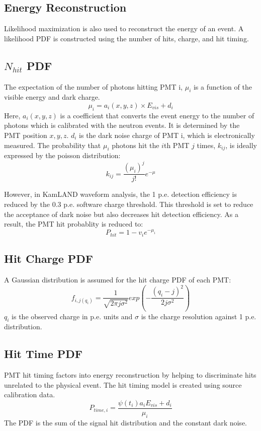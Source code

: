 \subsection{Energy Reconstruction}
\label{sec:energy_reco}
Likelihood maximization is also used to reconstruct the energy of an event. A likelihood PDF is constructed using the number of hits, charge, and hit timing.
\subsection*{$N_{hit}$ PDF}
The expectation of the number of photons hitting PMT i, $\mu_i$ is a function of the visible energy and dark charge.
\begin{equation}
	\mu_i = a_i(x,y,z)\times E_{vis} +d_i
\end{equation}
Here, $a_i(x,y,z)$ is a coefficient that converts the event energy to the number of photons which is calibrated with the neutron events. It is determined by the PMT position $x,y,z$. $d_i$ is the dark noise charge of PMT i, which is electronically measured. The probability that $\mu_i$ photons hit the $i$th PMT $j$ times, $k_{ij}$, is ideally expressed by the poisson distribution:
\begin{equation}
	k_{ij}=\frac{(\mu_i)^j}{j!}e^{-\mu}
\end{equation}

However, in KamLAND waveform analysis, the 1 p.e. detection efficiency is reduced by the 0.3 p.e. software charge threshold. This threshold is set to reduce the acceptance of dark noise but also decreases hit detection efficiency. As a result, the PMT hit probablity is reduced to:
\begin{equation}
	P_{hit}=1-v_ie^{-\mu_i}
\end{equation}

\subsection*{Hit Charge PDF}
A Gaussian distribution is assumed for the hit charge PDF of each PMT:
\begin{equation}
	f_{i,j(q_i)}=\frac{1}{\sqrt{2\pi j\sigma^2}}exp(-\frac{(q_i-j)^2}{2j\sigma^2})
\end{equation}
$q_i$ is the observed charge in p.e. units and $\sigma$ is  the charge resolution against 1 p.e. distribution.

\subsection*{Hit Time PDF}
PMT hit timing factors into energy reconstruction by helping to discriminate hits unrelated to the physical event. The hit timing model is created using source calibration data. 
\begin{equation}
	P_{time,i} = \frac{\psi(t_i)a_i E_{vis}+d_i}{\mu_i}
\end{equation}
The PDF is the sum of the signal hit distribution and the constant dark noise.
